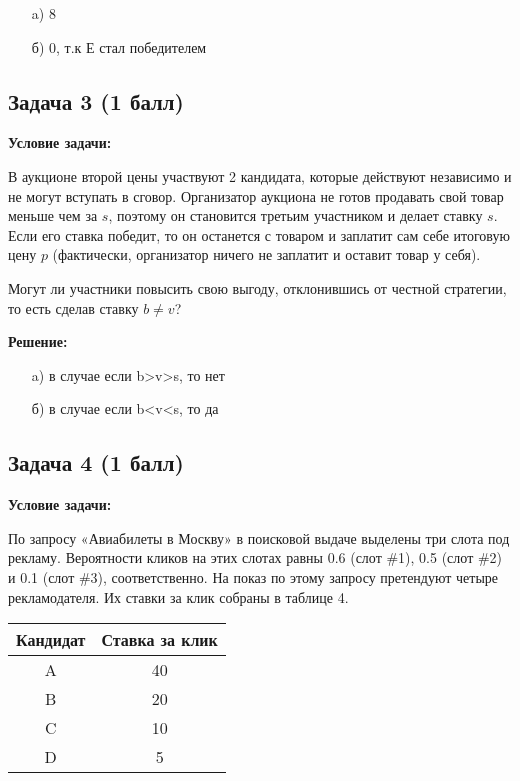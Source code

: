 \documentclass[a4paper,12pt]{article}
\begin{document}
\begin{itemize}
    \item[a)] 8
    \item[б)] 0, т.к Е стал победителем
\end{itemize}
\vspace{1cm}

\subsection{Задача 3 (1 балл)}
\textbf{Условие задачи:}

В аукционе второй цены участвуют 2 кандидата, которые действуют независимо и не могут вступать в сговор. Организатор аукциона не готов продавать свой товар меньше чем за $s$, поэтому он становится третьим участником и делает ставку $s$. Если его ставка победит, то он останется с товаром и заплатит сам себе итоговую цену $p$ (фактически, организатор ничего не заплатит и оставит товар у себя).

Могут ли участники повысить свою выгоду, отклонившись от честной стратегии, то есть сделав ставку $b \neq v$?

\textbf{Решение:}

\begin{itemize}
    \item [a)] в случае если b>v>s, то нет
    \item [б)] в случае если b<v<s, то да
\end{itemize}

\vspace{1cm}


\subsection{Задача 4 (1 балл)}
\textbf{Условие задачи:}

По запросу «Авиабилеты в Москву» в поисковой выдаче выделены три слота под рекламу. Вероятности кликов на этих слотах равны 0.6 (слот \#1), 0.5 (слот \#2) и 0.1 (слот \#3), соответственно. На показ по этому запросу претендуют четыре рекламодателя. Их ставки за клик собраны в таблице 4.

\begin{center}
\begin{tabular}{|c|c|}
\hline
Кандидат & Ставка за клик \\
\hline
A & 40 \\
B & 20 \\
C & 10 \\
D & 5 \\
\hline
\end{tabular}
\end{center}
\end{document}
